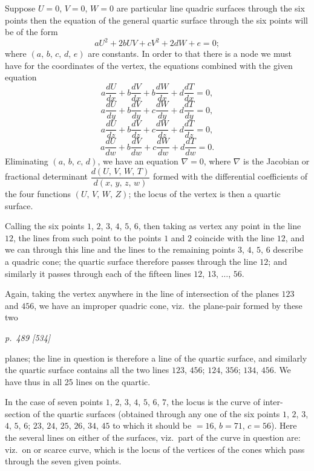 \documentclass[11pt,a4paper]{book}
\begin{document}
Suppose $U = 0$, $V = 0$, $W = 0$ are particular line quadric surfaces through the six points
then the equation of the general quartic surface through the six points will be
of the form
\[
aU^2 + 2bUV + cV^2 + 2dW + e = 0;
\]
where $(a,\,b,\,c,\,d,\,e)$ are constants. In order to that there is a node we must have for the coordinates of the vertex, the
equations combined with the given equation
\[
a\frac{dU}{dx} + b\frac{dV}{dx} + b\frac{dW}{dx} + d\frac{dT}{dx} = 0,
\]
\[
a\frac{dU}{dy} + b\frac{dV}{dy} + c\frac{dW}{dy} + d\frac{dT}{dy} = 0,
\]
\[
a\frac{dU}{dz} + b\frac{dV}{dz} + c\frac{dW}{dz} + d\frac{dT}{dz} = 0,
\]
\[
a\frac{dU}{dw} + b\frac{dV}{dw} + c\frac{dW}{dw} + d\frac{dT}{dw} = 0.
\]
Eliminating $(a,\,b,\,c,\,d)$, we have an equation $\nabla = 0$, where $\nabla$ is the Jacobian or
fractional determinant $\dfrac{d(U,\,V,\,W,\,T)}{d(x,\,y,\,z,\,w)}$ formed with the differential coefficients of the
four functions $(U,\,V,\,W,\,Z)$; the locus of the vertex is then a quartic surface.

Calling the six points $1$, $2$, $3$, $4$, $5$, $6$, then taking as vertex any point in the line
$12$, the lines from such point to the points $1$ and $2$ coincide with the line $12$, and
we can through this line and the lines to the remaining points $3$, $4$, $5$, $6$ describe a
quadric cone; the quartic surface therefore passes through the line $12$; and similarly
it passes through each of the fifteen lines $12$, $13$, $\ldots$, $56$.

Again, taking the vertex anywhere in the line of intersection of the planes $123$
and $456$, we have an improper quadric cone, viz.\ the plane-pair formed by these two

\clearpage

\bigskip
\textit{p.~489 [534]}
\smallskip

\noindent
planes; the line in question is therefore a line of the quartic surface, and similarly
the quartic surface contains all the two lines $123$, $456$; $124$, $356$; $134$, $456$. We
have thus in all 25 lines on the quartic.

In the case of seven points $1$, $2$, $3$, $4$, $5$, $6$, $7$, the locus is the curve of inter-
section of the quartic surfaces (obtained through any one of the six points $1$, $2$, $3$, $4$, $5$, $6$;
$23$, $24$, $25$, $26$, $34$, $45$ to which it should be $= 16$, $b = 71$, $c = 56$). Here the
several lines on either of the surfaces, viz.\ part of the curve in question are: viz.\ on
or scarce curve, which is the locus of the vertices of the cones which pass through
the seven given points.
\end{document}
